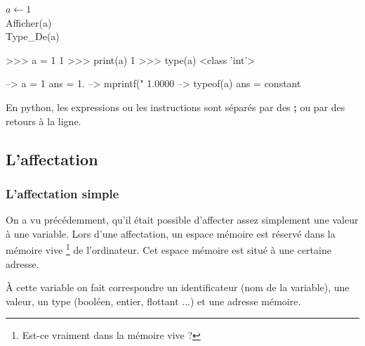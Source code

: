 \documentclass[11pt,oneside]{article}
\begin{document}
\begin{exemple}
\begin{minipage}[c]{.3\linewidth}
\begin{pseudo}
\begin{algorithm}[H]
$a\gets 1$\\
Afficher(a)\\
Type\_De(a)
\end{algorithm}
\end{pseudo}
\end{minipage} \hfill
\begin{minipage}[c]{.3\linewidth} 
\begin{py}
\begin{python}
>>> a = 1
	1
>>> print(a)
	1
>>> type(a)
	<class 'int'>
\end{python}
\end{py}
\end{minipage}\hfill
\begin{minipage}[c]{.3\linewidth}
\begin{sci}
\begin{scilab}
--> a = 1
	ans = 1.
--> mprintf("%
	1.0000
--> typeof(a)
	ans = constant
\end{scilab}
\end{sci}
\end{minipage}
\end{exemple}



\begin{rem}
En python, les expressions ou les instructions sont séparés par des \textbf{;} ou par des retours à la ligne.
\end{rem}


\subsection{L'affectation}

\subsubsection{L'affectation simple}
On a vu précédemment, qu'il était possible d'affecter assez simplement une valeur à une variable. Lors d'une affectation, 
un espace mémoire est réservé dans la mémoire vive \footnote{Est-ce vraiment dans la mémoire vive ?} de l'ordinateur. Cet espace mémoire est situé à une certaine adresse.

À cette variable on fait correspondre un identificateur (nom de la variable), une valeur, un type (booléen, entier, flottant ...) et une adresse mémoire.
\end{document}
